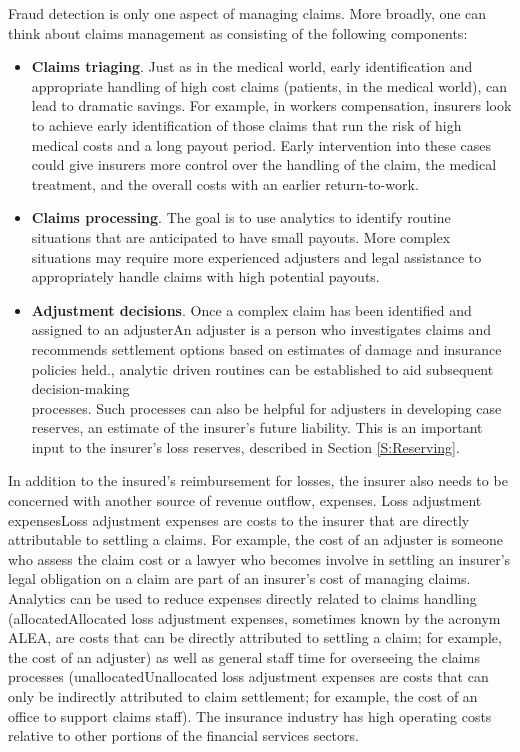 \documentclass[]{book}
\theoremstyle{definition}
\theoremstyle{definition}
\theoremstyle{definition}
\theoremstyle{remark}
\begin{document}
Fraud detection is only one aspect of managing claims. More broadly, one
can think about claims management as consisting of the following
components:

\begin{itemize}
\item
  \textbf{Claims triaging}. Just as in the medical world, early
  identification and appropriate handling of high cost claims (patients,
  in the medical world), can lead to dramatic savings. For example, in
  workers compensation, insurers look to achieve early identification of
  those claims that run the risk of high medical costs and a long payout
  period. Early intervention into these cases could give insurers more
  control over the handling of the claim, the medical treatment, and the
  overall costs with an earlier return-to-work.
\item
  \textbf{Claims processing}. The goal is to use analytics to identify
  routine situations that are anticipated to have small payouts. More
  complex situations may require more experienced adjusters and legal
  assistance to appropriately handle claims with high potential payouts.
\item
  \textbf{Adjustment decisions}. Once a complex claim has been
  identified and assigned to an adjuster{An adjuster is a person who
  investigates claims and recommends settlement options based on
  estimates of damage and insurance policies held.}, analytic driven
  routines can be established to aid subsequent decision-making\\
  processes. Such processes can also be helpful for adjusters in
  developing case reserves, an estimate of the insurer's future
  liability. This is an important input to the insurer's loss reserves,
  described in Section \ref{S:Reserving}.
\end{itemize}

In addition to the insured's reimbursement for losses, the insurer also
needs to be concerned with another source of revenue outflow, expenses.
Loss adjustment expenses{Loss adjustment expenses are costs to the
insurer that are directly attributable to settling a claims. For
example, the cost of an adjuster is someone who assess the claim cost or
a lawyer who becomes involve in settling an insurer's legal obligation
on a claim} are part of an insurer's cost of managing claims. Analytics
can be used to reduce expenses directly related to claims handling
(allocated{Allocated loss adjustment expenses, sometimes known by the
acronym ALEA, are costs that can be directly attributed to settling a
claim; for example, the cost of an adjuster}) as well as general staff
time for overseeing the claims processes (unallocated{Unallocated loss
adjustment expenses are costs that can only be indirectly attributed to
claim settlement; for example, the cost of an office to support claims
staff}). The insurance industry has high operating costs relative to
other portions of the financial services sectors.
\end{document}
